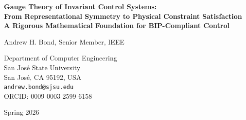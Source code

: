\documentclass[11pt]{article}
\begin{document}
\begin{titlepage}
\centering
\vspace*{2cm}

{\LARGE\bfseries Gauge Theory of Invariant Control Systems:\\From Representational Symmetry to Physical Constraint Satisfaction\\[0.5em]
\large A Rigorous Mathematical Foundation for BIP-Compliant Control}

\vspace{1.5cm}

{\Large Andrew H. Bond, Senior Member, IEEE}

\vspace{0.5cm}

{\large
Department of Computer Engineering\\
San Jos\'e State University\\
San Jos\'e, CA 95192, USA\\[0.3cm]
\texttt{andrew.bond@sjsu.edu}\\[0.3cm]
ORCID: 0009-0003-2599-6158
}

\vspace{1cm}

{\large Spring 2026}

\vspace{2cm}

\begin{abstract}
We develop a comprehensive gauge-theoretic framework for control systems that must
satisfy hard physical constraints. Building on the Bond Invariance Principle (BIP), we
construct a principal fiber bundle where the base manifold represents physically grounded
states, the structure group encodes representational transformations, and the connection
captures the canonicalization procedure. We prove that BIP-compliance is equivalent to
gauge invariance, derive conserved Noether currents corresponding to representational symmetry,
and establish that constraint satisfaction is preserved under closed-loop dynamics.
The framework is extended to dynamical control systems with explicit sensor models, enabling
formal verification of safety properties. We prove that controllers formulated in terms
of dimensionless quantities exhibit transfer invariance across physically similar systems. Applications
to plasma control in tokamak fusion devices are discussed, demonstrating that the
abstract mathematical structure yields concrete engineering guarantees.
\end{abstract}


\end{titlepage}
\end{document}
